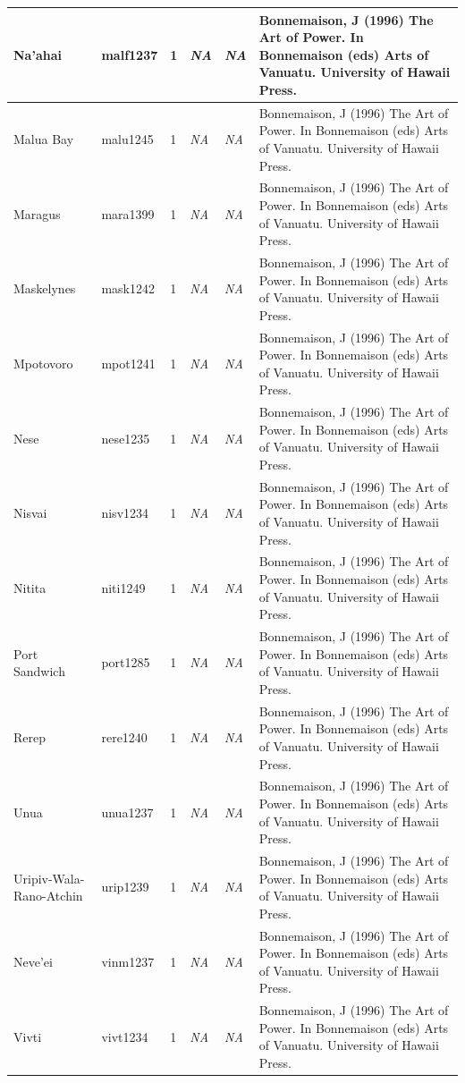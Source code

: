 \documentclass[draft,10pt]{article} %
\begin{document}
\begin{landscape}
\begin{longtable}{ | p{2cm}| p{2cm}| p{1.8cm}| p{1.8cm}| p{3cm}| p{9cm}| }
Na'ahai&malf1237&1&\emph{NA}&\emph{NA}&Bonnemaison, J (1996) The Art of Power. In Bonnemaison (eds) Arts of Vanuatu. University of Hawaii Press.\\ \hline
Malua Bay&malu1245&1&\emph{NA}&\emph{NA}&Bonnemaison, J (1996) The Art of Power. In Bonnemaison (eds) Arts of Vanuatu. University of Hawaii Press.\\ \hline
Maragus&mara1399&1&\emph{NA}&\emph{NA}&Bonnemaison, J (1996) The Art of Power. In Bonnemaison (eds) Arts of Vanuatu. University of Hawaii Press.\\ \hline
Maskelynes&mask1242&1&\emph{NA}&\emph{NA}&Bonnemaison, J (1996) The Art of Power. In Bonnemaison (eds) Arts of Vanuatu. University of Hawaii Press.\\ \hline
Mpotovoro&mpot1241&1&\emph{NA}&\emph{NA}&Bonnemaison, J (1996) The Art of Power. In Bonnemaison (eds) Arts of Vanuatu. University of Hawaii Press.\\ \hline
Nese&nese1235&1&\emph{NA}&\emph{NA}&Bonnemaison, J (1996) The Art of Power. In Bonnemaison (eds) Arts of Vanuatu. University of Hawaii Press.\\ \hline
Nisvai&nisv1234&1&\emph{NA}&\emph{NA}&Bonnemaison, J (1996) The Art of Power. In Bonnemaison (eds) Arts of Vanuatu. University of Hawaii Press.\\ \hline
Nitita&niti1249&1&\emph{NA}&\emph{NA}&Bonnemaison, J (1996) The Art of Power. In Bonnemaison (eds) Arts of Vanuatu. University of Hawaii Press.\\ \hline
Port Sandwich&port1285&1&\emph{NA}&\emph{NA}&Bonnemaison, J (1996) The Art of Power. In Bonnemaison (eds) Arts of Vanuatu. University of Hawaii Press.\\ \hline
Rerep&rere1240&1&\emph{NA}&\emph{NA}&Bonnemaison, J (1996) The Art of Power. In Bonnemaison (eds) Arts of Vanuatu. University of Hawaii Press.\\ \hline
Unua&unua1237&1&\emph{NA}&\emph{NA}&Bonnemaison, J (1996) The Art of Power. In Bonnemaison (eds) Arts of Vanuatu. University of Hawaii Press.\\ \hline
Uripiv-Wala-Rano-Atchin&urip1239&1&\emph{NA}&\emph{NA}&Bonnemaison, J (1996) The Art of Power. In Bonnemaison (eds) Arts of Vanuatu. University of Hawaii Press.\\ \hline
Neve'ei&vinm1237&1&\emph{NA}&\emph{NA}&Bonnemaison, J (1996) The Art of Power. In Bonnemaison (eds) Arts of Vanuatu. University of Hawaii Press.\\ \hline
Vivti&vivt1234&1&\emph{NA}&\emph{NA}&Bonnemaison, J (1996) The Art of Power. In Bonnemaison (eds) Arts of Vanuatu. University of Hawaii Press.\\ \hline

\end{longtable}
\end{landscape}
\end{document}
